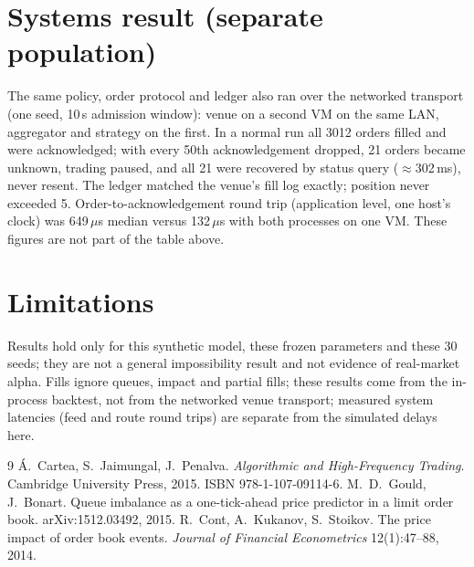 \documentclass[10pt,twocolumn]{article}
\begin{document}
\section{Systems result (separate population)}
The same policy, order protocol and ledger also ran over the networked transport (one seed, 10\,s
admission window): venue on a second VM on the same LAN, aggregator and strategy on the first.
In a normal run all 3012 orders filled and were acknowledged; with every 50th acknowledgement
dropped, 21 orders became unknown, trading paused, and all 21 were recovered by status query
($\approx$302\,ms), never resent. The ledger matched the venue's fill log exactly; position never
exceeded 5. Order-to-acknowledgement round trip (application level, one host's clock) was
649\,$\mu$s median versus 132\,$\mu$s with both processes on one VM. These figures are not part of
the table above.

\section{Limitations}
Results hold only for this synthetic model, these frozen parameters and these 30 seeds; they are not
a general impossibility result and not evidence of real-market alpha. Fills ignore queues, impact and
partial fills; these results come from the in-process backtest, not from the networked venue transport;
measured system latencies (feed and route round trips) are separate from the simulated delays here.

{\footnotesize
\begin{thebibliography}{9}\setlength{\itemsep}{0pt}
 \'A.~Cartea, S.~Jaimungal, J.~Penalva. \emph{Algorithmic and High-Frequency Trading}. Cambridge University Press, 2015. ISBN 978-1-107-09114-6.
 M.~D.~Gould, J.~Bonart. Queue imbalance as a one-tick-ahead price predictor in a limit order book. arXiv:1512.03492, 2015.
 R.~Cont, A.~Kukanov, S.~Stoikov. The price impact of order book events. \emph{Journal of Financial Econometrics} 12(1):47--88, 2014.
\end{thebibliography}}
\end{document}
